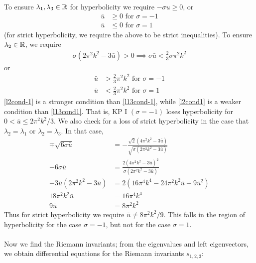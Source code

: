 \documentclass[12pt]{article}
\numberwithin{equation}{section}
\begin{document}
To ensure $\lambda_1,\lambda_3 \in \Bbb R$ for hyperbolicity we require $-\sigma u \geq 0$, or 
\begin{subequations}
    \begin{align}
    \bar u &\geq 0 \text{ for } \sigma = -1\label{l13cond-1} \\
    \bar u & \leq 0 \text{ for } \sigma = 1 \label{l13cond1}
    \end{align} \label{ucond}
\end{subequations}
(for strict hyperbolicity, we require the above to be strict inequalities). To ensure $\lambda_2 \in \Bbb R$, we require
\begin{align*}
    \sigma(2 \pi^2k^2-3\bar u) > 0 \implies \sigma \bar u < \frac{2}{3}\sigma \pi^2k^2
\end{align*}
or 
\begin{subequations}
    \begin{align}
        \bar u &>\frac{2}{3}\pi^2k^2  \text{ for } \sigma = -1 \label{l2cond-1}\\
        \bar u &< \frac{2}{3}\pi^2k^2  \text{ for } \sigma = 1 \label{l2cond1}
    \end{align}
\end{subequations}
\eqref{l2cond-1} is a stronger condition than \eqref{l13cond-1}, while \eqref{l2cond1} is a weaker condition than \eqref{l13cond1}. That is, KP I $(\sigma = -1)$ loses hyperbolicity for $0 < \bar u \leq 2\pi^2k^2/3$. We also check for a loss of strict hyperbolicity in the case that $\lambda_2 = \lambda_1$ or $\lambda_2=\lambda_3$. In that case,
\begin{align*}
    \mp \sqrt{6\sigma \bar u } &= -\frac{\sqrt{2} \left(4 \pi ^2 k^2-3
   \bar u\right)}{ \sqrt{\sigma(2 \pi ^2 k^2-3 \bar u)}} \\
   -6\sigma \bar u &= \frac{2 \left(4 \pi ^2 k^2-3
   \bar u\right)^2}{\sigma(2 \pi ^2 k^2-3 \bar u)} \\
   -3\bar u (2\pi^2k^2 - 3\bar u ) &= 2(16\pi^4k^4-24\pi^2k^2\bar u + 9 \bar u ^2) \\
   18\pi^2k^2\bar u &= 16\pi^4k^4 \\9\bar u &= 8\pi^2k^2
\end{align*}
Thus for strict hyperbolicity we require $\bar u \neq 8\pi^2k^2/9$. This falls in the region of hyperbolicity for the case $\sigma = -1$, but not for the case $\sigma = 1$.\\
\\
Now we find the Riemann invariants; from the eigenvalues and left eigenvectors, we obtain differential equations for the Riemann invariants $s_{1,2,3}$:
\end{document}
